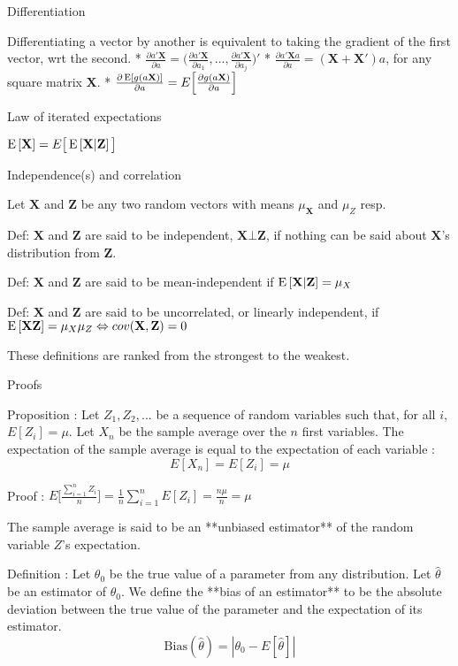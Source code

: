 Differentiation

Differentiating a vector by another is equivalent to taking the gradient of the first vector, wrt the second.
* $\frac{\partial a'\mathbf{X}}{\partial a} = \Big(\frac{\partial a'\mathbf{X}}{\partial a_1}, ..., \frac{\partial a'\mathbf{X}}{\partial a_j}\Big)'$
* $\frac{\partial a'\mathbf{X}a}{\partial a} = (\mathbf{X}+\mathbf{X}')a$, for any square matrix $\mathbf{X}$.
* $\frac{\partial \operatorname{E}\left[g(a\mathbf{X})\right]}{\partial a} = E\Big[\frac{\partial g(a\mathbf{X})}{\partial a}\Big]$

Law of iterated expectations

$\operatorname{E}\left[\mathbf{X}\right] = E\big[\operatorname{E}\left[\mathbf{X}|\mathbf{Z}\right]\big]$

Independence(s) and correlation

Let $\mathbf{X}$ and $\mathbf{Z}$ be any two random vectors with means $\mu_\mathbf{X}$ and $\mu_Z$ resp.

Def: $\mathbf{X}$ and $\mathbf{Z}$ are said to be independent, $\mathbf{X} \bot \mathbf{Z}$, if nothing can be said about $\mathbf{X}$'s distribution from $\mathbf{Z}$.

Def: $\mathbf{X}$ and $\mathbf{Z}$ are said to be mean-independent if $\operatorname{E}\left[\mathbf{X}|\mathbf{Z}\right] = \mu_X$

Def: $\mathbf{X}$ and $\mathbf{Z}$ are said to be uncorrelated, or linearly independent, if $\operatorname{E}\left[\mathbf{X}\mathbf{Z}\right] = \mu_X\mu_Z \Leftrightarrow cov(\mathbf{X},\mathbf{Z}) = 0$

These definitions are ranked from the strongest to the weakest.

Proofs

Proposition : Let $Z_1, Z_2, ...$ be a sequence of random variables such that, for all $i$, $E[Z_i] = \mu$. Let $X_n$ be the sample average over the $n$ first variables. The expectation of the sample average is equal to the expectation of each variable : $$ E[X_n] = E[Z_i] = \mu $$

Proof : $E\big[\frac{\sum_{i=1}^{n} Z_i}{n}\big] = \frac{1}{n}\sum_{i=1}^{n} E[Z_i] = \frac{n\mu}{n} = \mu $

The sample average is said to be an **unbiased estimator** of the random variable $Z$'s expectation.

Definition : Let $\theta_0$ be the true value of a parameter from any distribution. Let $\hat{\theta}$ be an estimator of $\theta_0$. We define the **bias of an estimator** to be the absolute deviation between the true value of the parameter and the expectation of its estimator. $$\text{Bias}(\hat{\theta}) = | \theta_0 - E[\hat{\theta}] | $$

